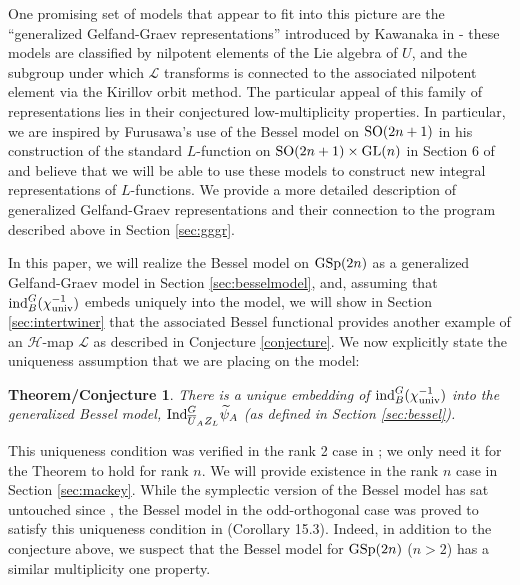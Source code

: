 \documentclass[11pt,letterpaper]{article}
\newcommand{\calL}{\mathcal{L}} %
\newcommand{\calH}{\mathcal{H}} %
\newcommand{\ve}{\varepsilon}
\newcommand{\GL}{\textup{GL}}
\newcommand{\SO}{\textup{SO}}
\newcommand{\GSp}{\textup{GSp}}
\newcommand{\Ind}{\textup{Ind}}
\newcommand{\ind}{\textup{ind}}
\newtheorem{Theorem/Conjecture}[Theorem]{Theorem/Conjecture}
\theoremstyle{remark}
\numberwithin{equation}{section}
\begin{document}
One promising set of models that appear to fit into this picture are the ``generalized Gelfand-Graev representations'' introduced by Kawanaka in \cite{Kaw} - these models are classified by nilpotent elements of the Lie algebra of $U$, and the subgroup under which $\calL$ transforms is connected to the associated nilpotent element via the Kirillov orbit method. The particular appeal of this family of representations lies in their conjectured low-multiplicity properties. In particular, we are inspired by Furusawa's use of the Bessel model on $\SO(2n+1)$ in his construction of the standard $L$-function on $\SO(2n+1) \times \GL(n)$ in Section 6 of \cite{BFF} and believe that we will be able to use these models to construct new integral representations of $L$-functions. We provide a more detailed description of generalized Gelfand-Graev representations and their connection to the program described above in Section \ref{sec:gggr}.


In this paper, we will realize the Bessel model on $\GSp(2n)$ as a generalized Gelfand-Graev model in Section \ref{sec:besselmodel}, and, assuming that $\ind_B^G (\chi_{\textup{univ}}^{-1})$ embeds uniquely into the model, we will show in Section \ref{sec:intertwiner} that the associated Bessel functional provides another example of an $\calH$-map $\calL$ as described in Conjecture \ref{conjecture}. We now explicitly state the uniqueness assumption that we are placing on the model:

\begin{Theorem/Conjecture}\label{conjecture2}
There is a unique embedding of $\ind_B^G (\chi_{\textup{univ}}^{-1})$ into the generalized Bessel model, $\Ind_{\overline{U}_AZ_L}^G \widetilde{\psi}_A$ (as defined in Section \ref{sec:bessel}).
\end{Theorem/Conjecture}

This uniqueness condition was verified in the rank 2 case in \cite{NPS}; we only need it for the Theorem to hold for rank $n$. We will provide existence in the rank $n$ case in Section \ref{sec:mackey}. While the symplectic version of the Bessel model has sat untouched since \cite{NPS}, the Bessel model in the odd-orthogonal case was proved to satisfy this uniqueness condition in \cite{GGP} (Corollary 15.3). Indeed, in addition to the conjecture above, we suspect that the Bessel model for $\GSp(2n)$ ($n>2$) has a similar multiplicity one property. 
\end{document}
